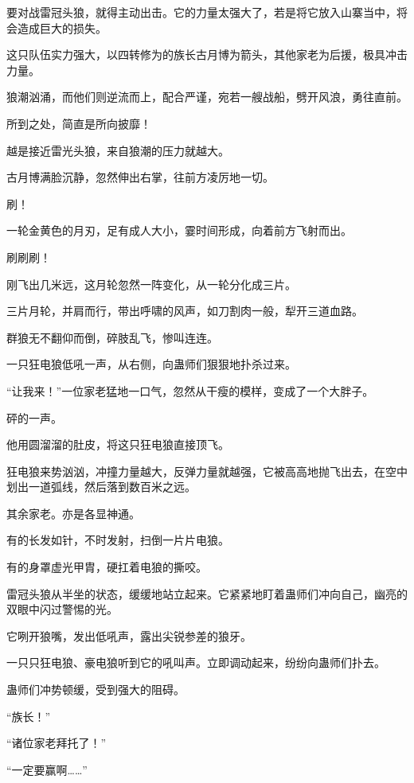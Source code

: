 
\begin{this_body}

要对战雷冠头狼，就得主动出击。它的力量太强大了，若是将它放入山寨当中，将会造成巨大的损失。

这只队伍实力强大，以四转修为的族长古月博为箭头，其他家老为后援，极具冲击力量。

狼潮汹涌，而他们则逆流而上，配合严谨，宛若一艘战船，劈开风浪，勇往直前。

所到之处，简直是所向披靡！

越是接近雷光头狼，来自狼潮的压力就越大。

古月博满脸沉静，忽然伸出右掌，往前方凌厉地一切。

刷！

一轮金黄色的月刃，足有成人大小，霎时间形成，向着前方飞射而出。

刷刷刷！

刚飞出几米远，这月轮忽然一阵变化，从一轮分化成三片。

三片月轮，并肩而行，带出呼啸的风声，如刀割肉一般，犁开三道血路。

群狼无不翻仰而倒，碎肢乱飞，惨叫连连。

一只狂电狼低吼一声，从右侧，向蛊师们狠狠地扑杀过来。

“让我来！”一位家老猛地一口气，忽然从干瘦的模样，变成了一个大胖子。

砰的一声。

他用圆溜溜的肚皮，将这只狂电狼直接顶飞。

狂电狼来势汹汹，冲撞力量越大，反弹力量就越强，它被高高地抛飞出去，在空中划出一道弧线，然后落到数百米之远。

其余家老。亦是各显神通。

有的长发如针，不时发射，扫倒一片片电狼。

有的身罩虚光甲胄，硬扛着电狼的撕咬。

雷冠头狼从半坐的状态，缓缓地站立起来。它紧紧地盯着蛊师们冲向自己，幽亮的双眼中闪过警惕的光。

它咧开狼嘴，发出低吼声，露出尖锐参差的狼牙。

一只只狂电狼、豪电狼听到它的吼叫声。立即调动起来，纷纷向蛊师们扑去。

蛊师们冲势顿缓，受到强大的阻碍。

“族长！”

“诸位家老拜托了！”

“一定要赢啊……”


\end{this_body}
